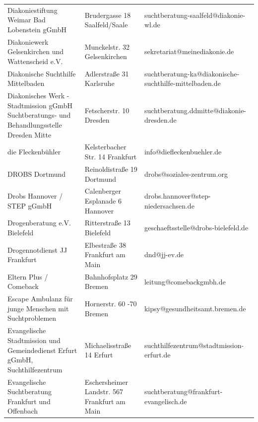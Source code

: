 {\begin{xltabular}{\textwidth} {
 >{\raggedright\arraybackslash}p{5cm}
 >{\raggedright\arraybackslash}X
 >{\raggedright\arraybackslash}p{5cm} }
Diakoniestiftung Weimar Bad Lobenstein gGmbH & Brudergasse 18 Saalfeld/Saale & suchtberatung-saalfeld@diakonie-wl.de \\
Diakoniewerk Gelsenkirchen und Wattenscheid e.V. & Munckelstr. 32 Gelsenkirchen & sekretariat@meinediakonie.de \\
Diakonische Suchthilfe Mittelbaden & Adlerstraße 31 Karlsruhe & suchtberatung-ka@diakonische-suchthilfe-mittelbaden.de \\
Diakonisches Werk - Stadtmission gGmbH Suchtberatungs- und Behandlungsstelle Dresden Mitte & Fetscherstr. 10 Dresden & suchtberatung.ddmitte@diakonie-dresden.de \\
die Fleckenbühler & Kelsterbacher Str. 14 Frankfurt & info@diefleckenbuehler.de \\
DROBS Dortmund & Reinoldistraße 19 Dortmund & drobs@soziales-zentrum.org \\
Drobs Hannover / STEP gGmbH & Calenberger Esplanade 6 Hannover & drobs.hannover@step-niedersachsen.de \\
Drogenberatung e.V. Bielefeld & Ritterstraße 13 Bielefeld & geschaeftsstelle@drobs-bielefeld.de \\
Drogennotdienst JJ Frankfurt & Elbestraße 38 Frankfurt am Main & dnd@jj-ev.de \\
Eltern Plus / Comeback & Bahnhofsplatz 29 Bremen & leitung@comebackgmbh.de \\
Escape Ambulanz für junge Menschen mit Suchtproblemen & Hornerstr. 60 -70 Bremen & kipsy@gesundheitsamt.bremen.de \\
Evangelische Stadtmission und Gemeindedienst Erfurt gGmbH, Suchthilfezentrum & Michaelisstraße 14 Erfurt & suchthilfezentrum@stadtmission-erfurt.de \\
Evangelische Suchtberatung Frankfurt und Offenbach & Eschersheimer Landstr. 567 Frankfurt am Main & suchtberatung@frankfurt-evangelisch.de \\

\end{xltabular}}
